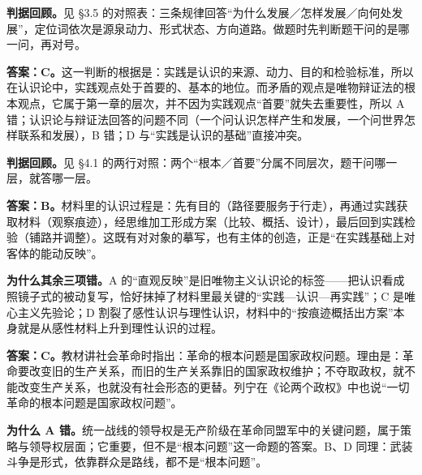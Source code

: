 \documentclass[11pt]{ctexart}
\begin{document}
\textbf{判据回顾。}见 §3.5 的对照表：三条规律回答“为什么发展／怎样发展／向何处发展”，定位词依次是源泉动力、形式状态、方向道路。做题时先判断题干问的是哪一问，再对号。


\textbf{答案：C。}这一判断的根据是：实践是认识的来源、动力、目的和检验标准，所以在认识论中，实践观点处于首要的、基本的地位。而矛盾的观点是唯物辩证法的根本观点，它属于第一章的层次，并不因为实践观点“首要”就失去重要性，所以 A 错；认识论与辩证法回答的问题不同（一个问认识怎样产生和发展，一个问世界怎样联系和发展），B 错；D 与“实践是认识的基础”直接冲突。

\textbf{判据回顾。}见 §4.1 的两行对照：两个“根本／首要”分属不同层次，题干问哪一层，就答哪一层。


\textbf{答案：B。}材料里的认识过程是：先有目的（路径要服务于行走），再通过实践获取材料（观察痕迹），经思维加工形成方案（比较、概括、设计），最后回到实践检验（铺路并调整）。这既有对对象的摹写，也有主体的创造，正是“在实践基础上对客体的能动反映”。

\textbf{为什么其余三项错。}A 的“直观反映”是旧唯物主义认识论的标签——把认识看成照镜子式的被动复写，恰好抹掉了材料里最关键的“实践—认识—再实践”；C 是唯心主义先验论；D 割裂了感性认识与理性认识，材料中的“按痕迹概括出方案”本身就是从感性材料上升到理性认识的过程。


\textbf{答案：C。}教材讲社会革命时指出：革命的根本问题是国家政权问题。理由是：革命要改变旧的生产关系，而旧的生产关系靠旧的国家政权维护；不夺取政权，就不能改变生产关系，也就没有社会形态的更替。列宁在《论两个政权》中也说“一切革命的根本问题是国家政权问题”。

\textbf{为什么 A 错。}统一战线的领导权是无产阶级在革命同盟军中的关键问题，属于策略与领导权层面；它重要，但不是“根本问题”这一命题的答案。B、D 同理：武装斗争是形式，依靠群众是路线，都不是“根本问题”。

\end{document}
